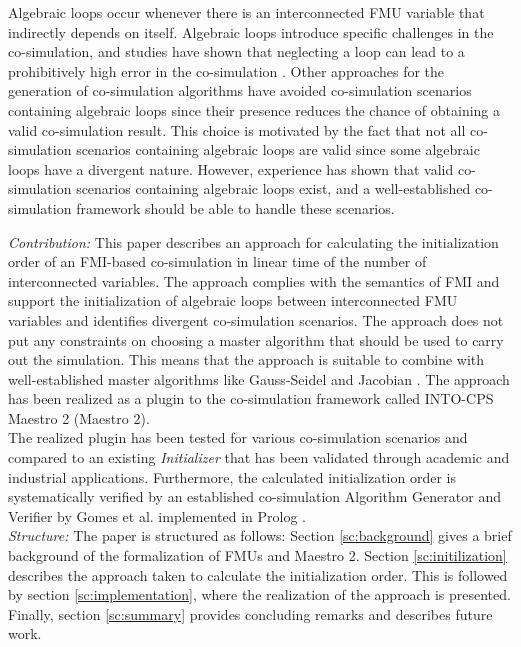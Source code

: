 \noindent Algebraic loops occur whenever there is an interconnected FMU variable that indirectly depends on itself. Algebraic loops introduce specific challenges in the co-simulation, and studies have shown that neglecting a loop can lead to a prohibitively high error in the co-simulation \cite{Kubler2000}. Other approaches for the generation of co-simulation algorithms have avoided co-simulation scenarios containing algebraic loops since their presence reduces the chance of obtaining a valid co-simulation result\cite{Amalio2016CheckingCo-simulation, BromanCompositionCo-Simulation}. This choice is motivated by the fact that not all co-simulation scenarios containing algebraic loops are valid since some algebraic loops have a divergent nature. However, experience has shown that valid co-simulation scenarios containing algebraic loops exist, and a well-established co-simulation framework should be able to handle these scenarios. 

\textit{Contribution:} This paper describes an approach for calculating the initialization order of an FMI-based co-simulation in linear time of the number of interconnected variables. The approach complies with the semantics of FMI and support the initialization of algebraic loops between interconnected FMU variables and identifies divergent co-simulation scenarios. The approach does not put any constraints on choosing a master algorithm that should be used to carry out the simulation. This means that the approach is suitable to combine with well-established master algorithms like Gauss-Seidel and Jacobian \cite{Palensky2017}. The approach has been realized as a plugin to the co-simulation framework called INTO-CPS Maestro 2 (Maestro 2). \\
The realized plugin has been tested for various co-simulation scenarios and compared to an existing \textit{Initializer} that has been validated through academic and industrial applications. 
Furthermore, the calculated initialization order is systematically verified by an established co-simulation Algorithm Generator and Verifier by Gomes et al. implemented in Prolog \cite{gomes_lucio_vangheluwe_2019}. \\

\textit{Structure:} The paper is structured as follows: Section \ref{sc:background} gives a brief background of the formalization of FMUs and Maestro 2. Section \ref{sc:initilization} describes the approach taken to calculate the initialization order. This is followed by section \ref{sc:implementation}, where the realization of the approach is presented. Finally, section \ref{sc:summary} provides concluding remarks and describes future work.